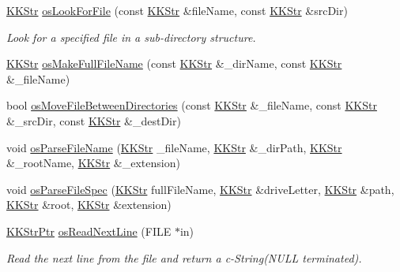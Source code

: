 \begin{DoxyCompactItemize}
\item 
\hyperlink{class_k_k_b_1_1_k_k_str}{K\+K\+Str} \hyperlink{namespace_k_k_b_af2c69fe9c1ecf3d518959933b22061e2}{os\+Look\+For\+File} (const \hyperlink{class_k_k_b_1_1_k_k_str}{K\+K\+Str} \&file\+Name, const \hyperlink{class_k_k_b_1_1_k_k_str}{K\+K\+Str} \&src\+Dir)
\begin{DoxyCompactList}\small\item\em Look for a specified file in a sub-\/directory structure. \end{DoxyCompactList}\item 
\hyperlink{class_k_k_b_1_1_k_k_str}{K\+K\+Str} \hyperlink{namespace_k_k_b_a34a265942430a4adfb2d48b7d4cb79cc}{os\+Make\+Full\+File\+Name} (const \hyperlink{class_k_k_b_1_1_k_k_str}{K\+K\+Str} \&\+\_\+dir\+Name, const \hyperlink{class_k_k_b_1_1_k_k_str}{K\+K\+Str} \&\+\_\+file\+Name)
\item 
bool \hyperlink{namespace_k_k_b_a065896fa95b0f5dbc87d83c2295bc939}{os\+Move\+File\+Between\+Directories} (const \hyperlink{class_k_k_b_1_1_k_k_str}{K\+K\+Str} \&\+\_\+file\+Name, const \hyperlink{class_k_k_b_1_1_k_k_str}{K\+K\+Str} \&\+\_\+src\+Dir, const \hyperlink{class_k_k_b_1_1_k_k_str}{K\+K\+Str} \&\+\_\+dest\+Dir)
\item 
void \hyperlink{namespace_k_k_b_a53511bb3f72e98913c8ee08cb7b37ec8}{os\+Parse\+File\+Name} (\hyperlink{class_k_k_b_1_1_k_k_str}{K\+K\+Str} \+\_\+file\+Name, \hyperlink{class_k_k_b_1_1_k_k_str}{K\+K\+Str} \&\+\_\+dir\+Path, \hyperlink{class_k_k_b_1_1_k_k_str}{K\+K\+Str} \&\+\_\+root\+Name, \hyperlink{class_k_k_b_1_1_k_k_str}{K\+K\+Str} \&\+\_\+extension)
\item 
void \hyperlink{namespace_k_k_b_a530b433e75c67e72541bb4bc408bb475}{os\+Parse\+File\+Spec} (\hyperlink{class_k_k_b_1_1_k_k_str}{K\+K\+Str} full\+File\+Name, \hyperlink{class_k_k_b_1_1_k_k_str}{K\+K\+Str} \&drive\+Letter, \hyperlink{class_k_k_b_1_1_k_k_str}{K\+K\+Str} \&path, \hyperlink{class_k_k_b_1_1_k_k_str}{K\+K\+Str} \&root, \hyperlink{class_k_k_b_1_1_k_k_str}{K\+K\+Str} \&extension)
\item 
\hyperlink{namespace_k_k_b_a9adbef5a6b3be0867f5570df2a08f388}{K\+K\+Str\+Ptr} \hyperlink{namespace_k_k_b_ac3dcd0cb8a5d1277d6d3517b31c31bc4}{os\+Read\+Next\+Line} (F\+I\+LE $\ast$in)
\begin{DoxyCompactList}\small\item\em Read the next line from the file and return a c-\/\+String(N\+U\+LL terminated). \end{DoxyCompactList}\item 

\end{DoxyCompactItemize}
